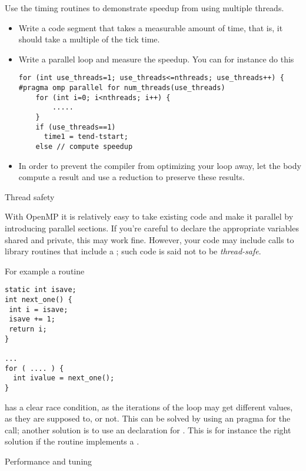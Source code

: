 \begin{exercise}
  Use the timing routines to demonstrate speedup from using
  multiple threads.
  \begin{itemize}
  \item Write a code segment that takes a measurable amount of time, that is,
    it should take a multiple of the tick time.
  \item Write a parallel loop and measure the speedup. You can for instance do this
\begin{lstlisting}
for (int use_threads=1; use_threads<=nthreads; use_threads++) {
#pragma omp parallel for num_threads(use_threads)
    for (int i=0; i<nthreads; i++) {
        .....
    }
    if (use_threads==1)
      time1 = tend-tstart;
    else // compute speedup
\end{lstlisting}
\item In order to prevent the compiler from optimizing your loop away, let
  the body compute a result and use a reduction to preserve these results.
  \end{itemize}
\end{exercise}

 {Thread safety}

With OpenMP it is relatively easy to take existing code and make
it parallel by introducing parallel sections. If you're careful
to declare the appropriate variables shared and private,
this may work fine. However, your code may include
calls to library routines that include a ;
such code is said not to be \emph{thread-safe}.

For example a routine
\begin{lstlisting}
static int isave;
int next_one() {
 int i = isave;
 isave += 1;
 return i;
}

...
for ( .... ) {
  int ivalue = next_one();
}
\end{lstlisting}
has a clear race condition, as the iterations of the loop
may get different  values, as they are supposed to,
or not. This can be solved by using an 
pragma for the  call; another solution 
is to use an  declaration for .
This is for instance the right solution if  the 
routine implements a .


 {Performance and tuning}


